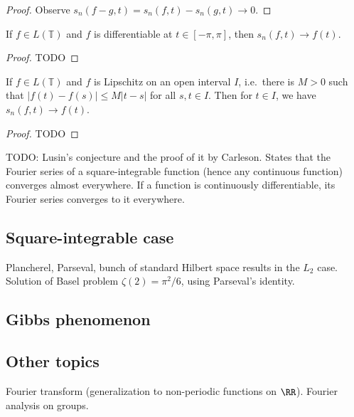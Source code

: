 \begin{proof}
Observe $s_n(f-g,t) = s_n(f,t) - s_n(g,t) \to 0$.
\end{proof}

\begin{theorem}[Dini]
If $f \in L(\mathbb{T})$ and $f$ is differentiable at $t \in [-\pi,\pi]$, then $s_n(f,t) \to f(t)$.
\end{theorem}

\begin{proof}
TODO
\end{proof}

\begin{theorem}
If $f \in L(\mathbb{T})$ and $f$ is Lipschitz on an open interval $I$, i.e.\ there is $M>0$ such that $|f(t)-f(s)| \leq M|t-s|$ for all $s,t \in I$. Then for $t \in I$, we have $s_n(f,t) \to f(t)$.
\end{theorem}

\begin{proof}
TODO
\end{proof}

\begin{remark}
TODO: Lusin's conjecture and the proof of it by Carleson. States that the Fourier series of a square-integrable function (hence any continuous function) converges almost everywhere. If a function is continuously differentiable, its Fourier series converges to it everywhere.
\end{remark}

\subsection{Square-integrable case}

Plancherel, Parseval, bunch of standard Hilbert space results in the $L_2$ case. Solution of Basel problem $\zeta(2) = \pi^2/6$, using Parseval's identity.

\subsection{Gibbs phenomenon}

\subsection{Other topics}

Fourier transform (generalization to non-periodic functions on $\RR$). Fourier analysis on groups.